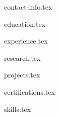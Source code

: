 \documentclass{resume}
\begin{document}
{contact-info.tex}


{education.tex}

{experience.tex}

{research.tex}

{projects.tex}

{certifications.tex}

{skills.tex}
\end{document}
